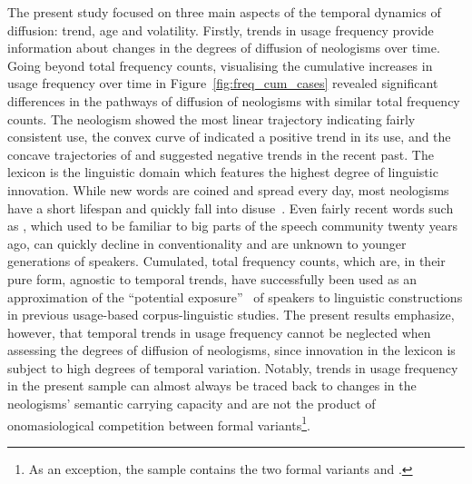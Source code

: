 \documentclass[
  a4paper,
  abstract=on,
  captions=tableabove
  ]{scrartcl}
\begin{document}
    The present study focused on three main aspects of the temporal dynamics of diffusion: trend, age and volatility. Firstly, trends in usage frequency provide information about changes in the degrees of diffusion of neologisms over time. Going beyond total frequency counts, visualising the cumulative increases in usage frequency over time in Figure~\ref{fig:freq_cum_cases} revealed significant differences in the pathways of diffusion of neologisms with similar total frequency counts. The neologism  showed the most linear trajectory indicating fairly consistent use, the convex curve of  indicated a positive trend in its use, and the concave trajectories of  and  suggested negative trends in the recent past. The lexicon is the linguistic domain which features the highest degree of linguistic innovation. While new words are coined and spread every day, most neologisms have a short lifespan and quickly fall into disuse~\parencite{Algeo1993DesuetudeNew}. Even fairly recent words such as , which used to be familiar to big parts of the speech community twenty years ago, can quickly decline in conventionality and are unknown to younger generations of speakers. Cumulated, total frequency counts, which are, in their pure form, agnostic to temporal trends, have successfully been used as an approximation of the \enquote{potential exposure}~\parencite{Stefanowitsch2017CorpusbasedPerspective} of speakers to linguistic constructions in previous usage-based corpus-linguistic studies. The present results emphasize, however, that temporal trends in usage frequency cannot be neglected when assessing the degrees of diffusion of neologisms, since innovation in the lexicon is subject to high degrees of temporal variation. Notably, trends in usage frequency in the present sample can almost always be traced back to changes in the neologisms' semantic carrying capacity and are not the product of onomasiological competition between formal variants\footnote{As an exception, the sample contains the two formal variants  and .}.
\end{document}
